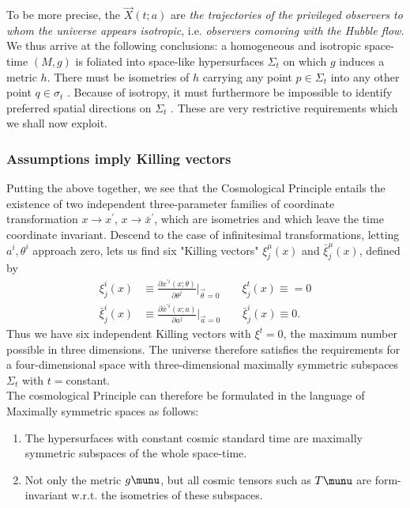 	To be more precise, the $\vec{X}(t;a)$ are \emph{the trajectories of the privileged observers to whom the universe appears isotropic}, i.e. \emph{observers comoving with the Hubble flow.}
	\\
	We thus arrive at the following conclusions: a homogeneous and isotropic
	space-time $(M, g)$ is foliated into space-like hypersurfaces $\Sigma_t$ on which $g$
	induces a metric $h$. There must be isometries of $h$ carrying any point $p \in \Sigma_t$ into any other point $q \in \sigma_t$ . Because of isotropy, it must furthermore	be impossible to identify preferred spatial directions on $\Sigma_t$ . These are
	very restrictive requirements which we shall now exploit.
	\subsubsection{Assumptions imply Killing vectors}
	Putting the above together, we see that the Cosmological Principle entails the existence of two independent three-parameter families of coordinate transformation $x\rightarrow x^\prime$, $x\rightarrow\bar{x}^\prime$, which are isometries and which leave the time coordinate invariant. Descend to the case of infinitesimal transformations, letting $a^i, \theta^i$ approach zero, lets us find six "Killing vectors" $\xi^\mu_j(x)$ and $\bar{\xi}^\mu_j(x)$, defined by
	\begin{align}
		\label{eq:cosmologicalKillingVectors}
		\xi^i_j(x) & \equiv \frac{\partial x^{\prime i}(x;\theta)}{\partial \theta^j} |_{\vec{\theta}=0} \qquad  \xi^t_j(x)\equiv=0\\
		\bar{\xi}^i_j(x) &\equiv \frac{\partial \bar{x}^{\prime i} (x;a)}{\partial a^j} |_{\vec{a}=0} \qquad \bar{\xi}^i_j(x)\equiv 0.
	\end{align}
	 Thus we have six independent Killing vectors with $\xi^t=0$, the maximum number possible in three dimensions. The universe therefore satisfies the requirements for a four-dimensional space with three-dimensional maximally symmetric subspaces $\Sigma_t$ with $t=$constant.\\
	The cosmological Principle can therefore be formulated in the language of Maximally symmetric spaces as follows:
	\begin{enumerate}
	\item The hypersurfaces with constant cosmic standard time are maximally symmetric subspaces of the whole space-time.
	\item Not only the metric $g\munu$, but all cosmic tensors such as $T\munu$ are form-invariant w.r.t. the isometries of these subspaces.
	\end{enumerate}
	
